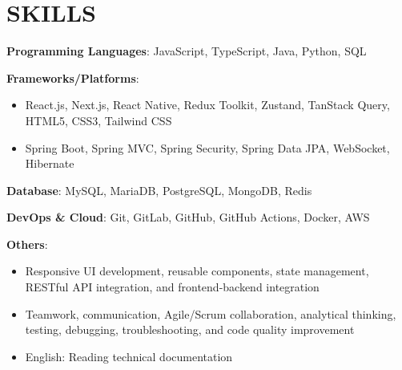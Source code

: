 \section{SKILLS}
\resumeSubHeadingListStart

  \item
    \resumeItemListStart
      \item \textbf{Programming Languages}: JavaScript, TypeScript, Java, Python, SQL
      \item \textbf{Frameworks/Platforms}:
        \begin{itemize}
          \item React.js, Next.js, React Native, Redux Toolkit, Zustand, TanStack Query, HTML5, CSS3, Tailwind CSS
          \item Spring Boot, Spring MVC, Spring Security, Spring Data JPA, WebSocket, Hibernate
        \end{itemize}
      \item \textbf{Database}: MySQL, MariaDB, PostgreSQL, MongoDB, Redis
      \item \textbf{DevOps \& Cloud}: Git, GitLab, GitHub, GitHub Actions, Docker, AWS
      \item \textbf{Others}:
        \begin{itemize}
          \item Responsive UI development, reusable components, state management, RESTful API integration, and frontend-backend integration
          \item Teamwork, communication, Agile/Scrum collaboration, analytical thinking, testing, debugging, troubleshooting, and code quality improvement
          \item English: Reading technical documentation
        \end{itemize}
    \resumeItemListEnd

\resumeSubHeadingListEnd
